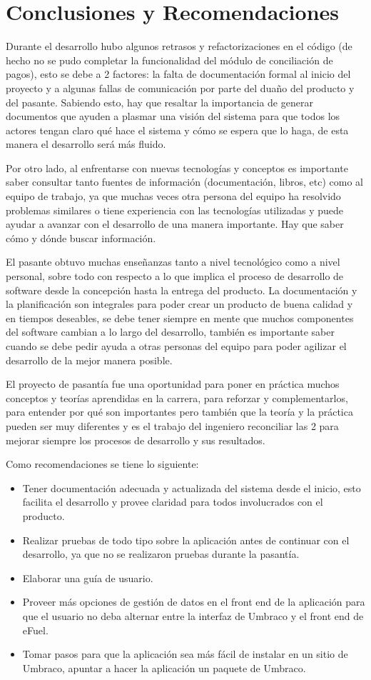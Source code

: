 \chapter*{Conclusiones y Recomendaciones}
Durante el desarrollo hubo algunos retrasos y refactorizaciones en el código (de hecho no se pudo completar la funcionalidad del módulo de conciliación de pagos), esto se debe a 2 factores: la falta de documentación formal al inicio del proyecto y a algunas fallas de comunicación por parte del duaño del producto y del pasante. Sabiendo esto, hay que resaltar la importancia de generar documentos que ayuden a plasmar una visión del sistema para que todos los actores tengan claro qué hace el sistema y cómo se espera que lo haga, de esta manera el desarrollo será más fluido.

Por otro lado, al enfrentarse con nuevas tecnologías y conceptos es importante saber consultar tanto fuentes de información (documentación, libros, etc) como al equipo de trabajo, ya que muchas veces otra persona del equipo ha resolvido problemas similares o tiene experiencia con las tecnologías utilizadas y puede ayudar a avanzar con el desarrollo de una manera importante. Hay que saber cómo y dónde buscar información.

El pasante obtuvo muchas enseñanzas tanto a nivel tecnológico como a nivel personal, sobre todo con respecto a lo que implica el proceso de desarrollo de software desde la concepción hasta la entrega del producto. La documentación y la planificación son integrales para poder crear un producto de buena calidad y en tiempos deseables, se debe tener siempre en mente que muchos componentes del software cambian a lo largo del desarrollo, también es importante saber cuando se debe pedir ayuda a otras personas del equipo para poder agilizar el desarrollo de la mejor manera posible.

El proyecto de pasantía fue una oportunidad para poner en práctica muchos conceptos y teorías aprendidas en la carrera, para reforzar y complementarlos, para entender por qué son importantes pero también que la teoría y la práctica pueden ser muy diferentes y es el trabajo del ingeniero reconciliar las 2 para mejorar siempre los procesos de desarrollo y sus resultados.

Como recomendaciones se tiene lo siguiente:
\begin{itemize}
    \item Tener documentación adecuada y actualizada del sistema desde el inicio, esto facilita el desarrollo y provee claridad para todos involucrados con el producto.
    \item Realizar pruebas de todo tipo sobre la aplicación antes de continuar con el desarrollo, ya que no se realizaron pruebas durante la pasantía.
    \item Elaborar una guía de usuario.
    \item Proveer más opciones de gestión de datos en el front end de la aplicación para que el usuario no deba alternar entre la interfaz de Umbraco y el front end de eFuel.
    \item Tomar pasos para que la aplicación sea más fácil de instalar en un sitio de Umbraco, apuntar a hacer la aplicación un paquete de Umbraco.
\end{itemize}
